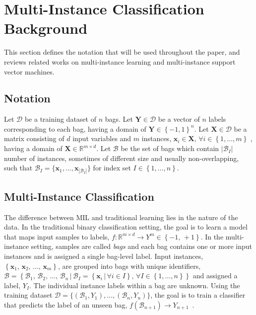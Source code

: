 \documentclass[reqno]{vcuthesis}
\newcommand{\set}[1]{{\left\{#1\right\}}}
\newcommand{\st}{{\,|\,}}
\newcommand{\reals}{{\mathbb{R}}}
\numberwithin{equation}{chapter}
\begin{document}
\section{Multi-Instance Classification Background}\label{sec:mibackground}
This section defines the notation that will be used throughout the paper, and reviews related works on multi-instance learning and multi-instance support vector machines.

\subsection{Notation}\label{subsec:minotation}
Let $\mathcal{D}$ be a training dataset of $n$ bags. Let $\bm{Y} \in \mathcal{D}$ be a vector of $n$ labels corresponding to each bag, having a domain of $\bm{Y} \in \set{-1,1}^n$. Let $\bm{X} \in \mathcal{D}$ be a matrix consisting of $d$ input variables and $m$ instances, $\bm x_i \in \bm X,\, \forall i \in \set{1,\ldots,m}$ , having a domain of $\bm{X} \in \mathbb{R}^{m \times d}$. Let $\mathcal{B}$ be the set of bags which contain $|\mathcal{B}_I|$ number of instances, sometimes of different size and usually non-overlapping, such that $\mathcal{B}_I = \{\bm x_{1}, \ldots, \bm x_{|\mathcal{B}_I|}\}$ for index set $I \in \set{1,\ldots,n}$. 

\subsection{Multi-Instance Classification}
The difference between MIL and traditional learning lies in the nature of the data. In the traditional binary classification setting, the goal is to learn a model that maps input samples to labels, $f: \reals^{m \times d} \rightarrow Y^m \in \set{-1,\,+1}$. In the multi-instance setting, samples are called \textit{bags} and each bag contains one or more input instances and is assigned a single bag-level label. Input instances, $\set{\bm x_1,\, \bm x_2,\, \ldots,\, \bm x_m}$, are grouped into bags with unique identifiers, $\mathcal{B} = \set{\mathcal{B}_1,\, \mathcal{B}_2,\, \ldots,\, \mathcal{B}_n \st \mathcal{B}_I = \set{\bm x_i \st \forall i \in I},\, \forall I \in \set{1, \ldots, n}}$ and assigned a label, $Y_I$. The individual instance labels within a bag are unknown. Using the training dataset $\mathcal{D} = \{(\mathcal{B}_1,Y_1), \ldots, (\mathcal{B}_n,Y_n)\}$, the goal is to train a classifier that predicts the label of an unseen bag, $f(\mathcal{B}_{n+1}) \rightarrow Y_{n+1}$~\cite{Amores2013}. 
\end{document}
